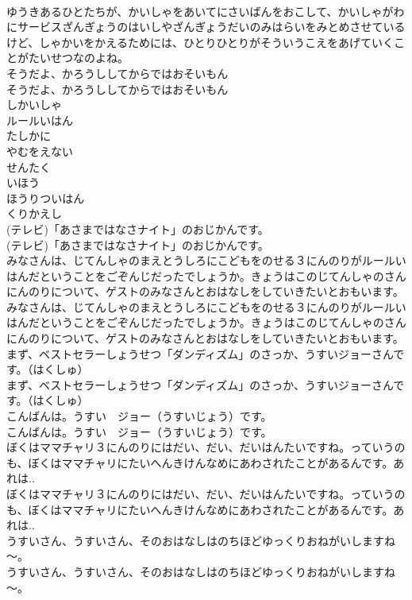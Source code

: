\documentclass[8pt]{extreport}
\begin{document}
\begin{CJK}{UTF8}{min}
\\	ゆうきあるひとたちが、かいしゃをあいてにさいばんをおこして、かいしゃがわにサービスざんぎょうのはいしやざんぎょうだいのみはらいをみとめさせているけど、しゃかいをかえるためには、ひとりひとりがそういうこえをあげていくことがたいせつなのよね。
\\	そうだよ、かろうししてからではおそいもん
\\	そうだよ、かろうししてからではおそいもん
\\	しかいしゃ
\\	ルールいはん
\\	たしかに
\\	やむをえない
\\	せんたく
\\	いほう
\\	ほうりついはん
\\	くりかえし
\\	(テレビ)「あさまではなさナイト」のおじかんです。
\\	(テレビ)「あさまではなさナイト」のおじかんです。
\\	みなさんは、じてんしゃのまえとうしろにこどもをのせる３にんのりがルールいはんだということをごぞんじだったでしょうか。きょうはこのじてんしゃのさんにんのりについて、ゲストのみなさんとおはなしをしていきたいとおもいます。
\\	みなさんは、じてんしゃのまえとうしろにこどもをのせる３にんのりがルールいはんだということをごぞんじだったでしょうか。きょうはこのじてんしゃのさんにんのりについて、ゲストのみなさんとおはなしをしていきたいとおもいます。
\\	まず、ベストセラーしょうせつ「ダンディズム」のさっか、うすいジョーさんです。（はくしゅ）
\\	まず、ベストセラーしょうせつ「ダンディズム」のさっか、うすいジョーさんです。（はくしゅ）
\\	こんばんは。うすい　ジョー（うすいじょう）です。
\\	こんばんは。うすい　ジョー（うすいじょう）です。
\\	ぼくはママチャリ３にんのりにはだい、だい、だいはんたいですね。っていうのも、ぼくはママチャリにたいへんきけんなめにあわされたことがあるんです。あれは..
\\	ぼくはママチャリ３にんのりにはだい、だい、だいはんたいですね。っていうのも、ぼくはママチャリにたいへんきけんなめにあわされたことがあるんです。あれは..
\\	うすいさん、うすいさん、そのおはなしはのちほどゆっくりおねがいしますね～。
\\	うすいさん、うすいさん、そのおはなしはのちほどゆっくりおねがいしますね～。

\end{CJK}
\end{document}
